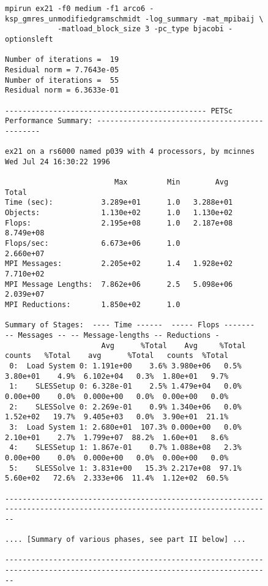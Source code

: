 \begin{figure}[tb]
{\tiny
\begin{verbatim}
mpirun ex21 -f0 medium -f1 arco6 -ksp_gmres_unmodifiedgramschmidt -log_summary -mat_mpibaij \
            -matload_block_size 3 -pc_type bjacobi -optionsleft

Number of iterations =  19
Residual norm = 7.7643e-05
Number of iterations =  55
Residual norm = 6.3633e-01

---------------------------------------------- PETSc Performance Summary: ----------------------------------------------

ex21 on a rs6000 named p039 with 4 processors, by mcinnes Wed Jul 24 16:30:22 1996

                         Max         Min        Avg        Total 
Time (sec):           3.289e+01      1.0   3.288e+01
Objects:              1.130e+02      1.0   1.130e+02
Flops:                2.195e+08      1.0   2.187e+08   8.749e+08
Flops/sec:            6.673e+06      1.0               2.660e+07
MPI Messages:         2.205e+02      1.4   1.928e+02   7.710e+02
MPI Message Lengths:  7.862e+06      2.5   5.098e+06   2.039e+07
MPI Reductions:       1.850e+02      1.0

Summary of Stages:  ---- Time ------  ----- Flops -------  -- Messages -- -- Message-lengths -- Reductions -
                      Avg      %Total    Avg     %Total   counts   %Total    avg      %Total   counts  %Total 
 0:  Load System 0: 1.191e+00    3.6% 3.980e+06   0.5%  3.80e+01    4.9%  6.102e+04   0.3%  1.80e+01   9.7% 
 1:    SLESSetup 0: 6.328e-01    2.5% 1.479e+04   0.0%  0.00e+00    0.0%  0.000e+00   0.0%  0.00e+00   0.0% 
 2:    SLESSolve 0: 2.269e-01    0.9% 1.340e+06   0.0%  1.52e+02   19.7%  9.405e+03   0.0%  3.90e+01  21.1% 
 3:  Load System 1: 2.680e+01  107.3% 0.000e+00   0.0%  2.10e+01    2.7%  1.799e+07  88.2%  1.60e+01   8.6% 
 4:    SLESSetup 1: 1.867e-01    0.7% 1.088e+08   2.3%  0.00e+00    0.0%  0.000e+00   0.0%  0.00e+00   0.0% 
 5:    SLESSolve 1: 3.831e+00   15.3% 2.217e+08  97.1%  5.60e+02   72.6%  2.333e+06  11.4%  1.12e+02  60.5% 

------------------------------------------------------------------------------------------------------------------------

.... [Summary of various phases, see part II below] ...

------------------------------------------------------------------------------------------------------------------------


\end{verbatim}}
\end{figure}
